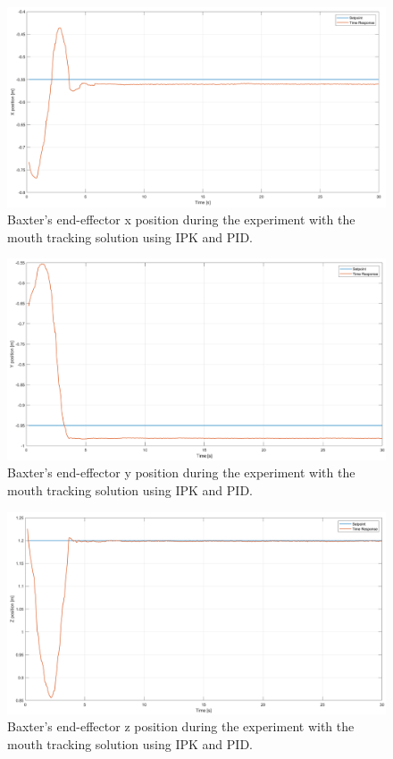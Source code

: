 \documentclass[11pt]{report} %
\begin{document}
\begin{figure}[H]
    \centering
    \includegraphics[width=1.0\linewidth]{assets/imgs/control_theory/pid_tests/x_pose.png}
    \caption{Baxter's end-effector x position during the experiment with the mouth tracking solution using IPK and PID.} 
    \label{fig_baxter_x_pose_pid_experiments}
\end{figure}

\begin{figure}[H]
    \centering
    \includegraphics[width=1.0\linewidth]{assets/imgs/control_theory/pid_tests/y_pose.png}
    \caption{Baxter's end-effector y position during the experiment with the mouth tracking solution using IPK and PID.} 
    \label{fig_baxter_y_pose_pid_experiments}
\end{figure}

\begin{figure}[H]
    \centering
    \includegraphics[width=1.0\linewidth]{assets/imgs/control_theory/pid_tests/z_pose.png}
    \caption{Baxter's end-effector z position during the experiment with the mouth tracking solution using IPK and PID.} 
    \label{fig_baxter_z_pose_pid_experiments}
\end{figure}
\end{document}
